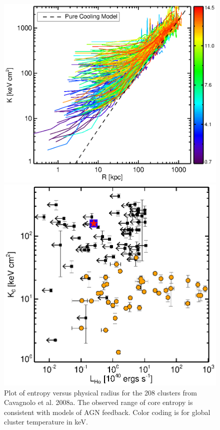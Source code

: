 \documentclass[letterpaper,11pt]{article}
\begin{document}
\begin{figure}[t]
\begin{minipage}[t]{0.5\linewidth}
	\centering
	\includegraphics*[width=\columnwidth, trim=28mm 10mm 30mm 17mm, clip]{splots}
	\caption{\small
	Plot of entropy versus physical radius for the 208 clusters from
	Cavagnolo et al. 2008a. The observed range of core entropy is
	consistent with models of AGN feedback. Color coding is for global
	cluster temperature in keV.
	}
	\label{fig:ent}
    \end{minipage}
    \hspace{0.25cm}
    \begin{minipage}[t]{0.5\linewidth}
        \centering
        \includegraphics*[width=\textwidth, trim=22mm 8mm 30mm 15mm, clip]{k0ha}

\end{minipage}
\end{figure}
\end{document}
